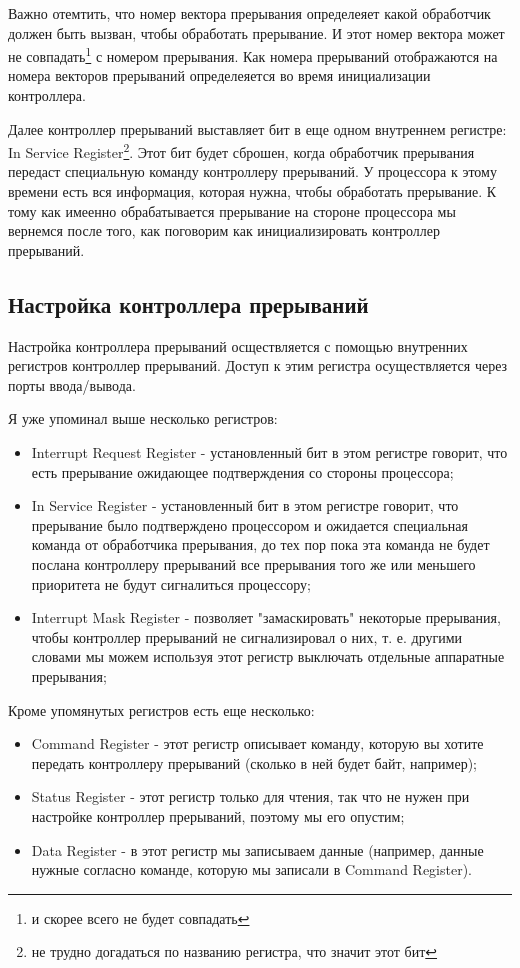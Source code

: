 Важно отемтить, что номер вектора прерывания определеяет какой обработчик должен
быть вызван, чтобы обработать прерывание. И этот номер вектора может не
совпадать\footnote{и скорее всего не будет совпадать} с номером прерывания. Как
номера прерываний отображаются на номера векторов прерываний определеяется во
время инициализации контроллера.

Далее контроллер прерываний выставляет бит в еще одном внутреннем регистре: In
Service Register\footnote{не трудно догадаться по названию регистра, что значит
этот бит}. Этот бит будет сброшен, когда обработчик прерывания передаст
специальную команду контроллеру прерываний. У процессора к этому времени есть
вся информация, которая нужна, чтобы обработать прерывание. К тому как имеенно
обрабатывается прерывание на стороне процессора мы вернемся после того, как
поговорим как инициализировать контроллер прерываний.

\subsection{Настройка контроллера прерываний}

Настройка контроллера прерываний осществляется с помощью внутренних регистров
контроллер прерываний. Доступ к этим регистра осуществляется через порты
ввода/вывода.

Я уже упоминал выше несколько регистров:
\begin{itemize}
  \item Interrupt Request Register - установленный бит в этом регистре говорит,
        что есть прерывание ожидающее подтверждения со стороны процессора;
  \item In Service Register - установленный бит в этом регистре говорит, что
        прерывание было подтверждено процессором и ожидается специальная
        команда от обработчика прерывания, до тех пор пока эта команда не будет
        послана контроллеру прерываний все прерывания того же или меньшего
        приоритета не будут сигналиться процессору;
  \item Interrupt Mask Register - позволяет "замаскировать" некоторые
        прерывания, чтобы контроллер прерываний не сигнализировал о них, т. е.
        другими словами мы можем используя этот регистр выключать отдельные
        аппаратные прерывания;
\end{itemize}

Кроме упомянутых регистров есть еще несколько:
\begin{itemize}
  \item Command Register - этот регистр описывает команду, которую вы хотите
        передать контроллеру прерываний (сколько в ней будет байт, например);
  \item Status Register - этот регистр только для чтения, так что не нужен при
        настройке контроллер прерываний, поэтому мы его опустим;
  \item Data Register - в этот регистр мы записываем данные (например, данные
        нужные согласно команде, которую мы записали в Command Register).
\end{itemize}

